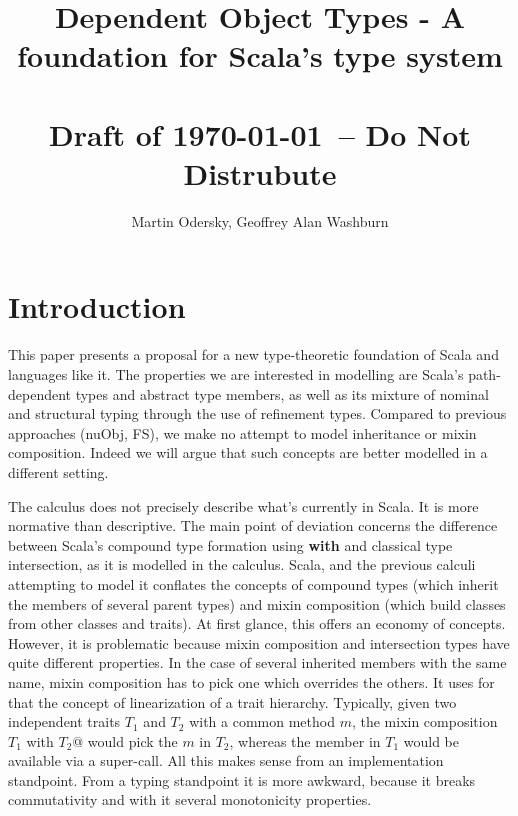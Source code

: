 \documentclass{llncs}
\newif\ifdep\depfalse
\newcommand{\dabs}[3]{(#1\!:\!#2)\Rightarrow #3}
\newcommand{\abs}[3]{\lambda #1\!:\!#2.#3}
\begin{document}
\thispagestyle{plain}
\pagestyle{plain}
\mainmatter

\title{Dependent Object Types - A foundation for Scala's type system
  \\ \ \\ \large Draft of \today\ -- Do Not Distrubute}
\author{Martin Odersky, Geoffrey Alan Washburn}

\maketitle
\sloppy
\newcommand{\lindent}{\hspace{-4mm}}

\begin{abstract}
\end{abstract}
\renewcommand{\abs}[3]{\ifdep \dabs #1 #2 #3 \else \lambda #1\!:\!#2.#3 \fi}

\section{Introduction}

This paper presents a proposal for a new type-theoretic foundation of
Scala and languages like it. The properties we are interested in
modelling are Scala's path-dependent types and abstract type members,
as well as its mixture of nominal and structural typing through the
use of refinement types. Compared to previous approaches (nuObj, FS),
we make no attempt to model inheritance or mixin composition. Indeed
we will argue that such concepts are better modelled in a different
setting.

The calculus does not precisely describe what's currently in Scala. It
is more normative than descriptive. The main point of deviation
concerns the difference between Scala's compound type formation using
{\bf with} and classical type intersection, as it is modelled in the
calculus. Scala, and the previous calculi attempting to model it
conflates the concepts of compound types (which inherit the members of
several parent types) and mixin composition (which build classes from
other classes and traits). At first glance, this offers an economy of
concepts. However, it is problematic because mixin composition and
intersection types have quite different properties. In the case of
several inherited members with the same name, mixin composition has to
pick one which overrides the others. It uses for that the concept of
linearization of a trait hierarchy. Typically, given two independent
traits $T_1$ and $T_2$ with a common method $m$, the mixin composition
\c@$T_1$ with $T_2$@ would pick the $m$ in $T_2$, whereas the member in
$T_1$ would be available via a super-call. All this makes sense from
an implementation standpoint. From a typing standpoint it is more
awkward, because it breaks commutativity and with it several
monotonicity properties.
\end{document}
